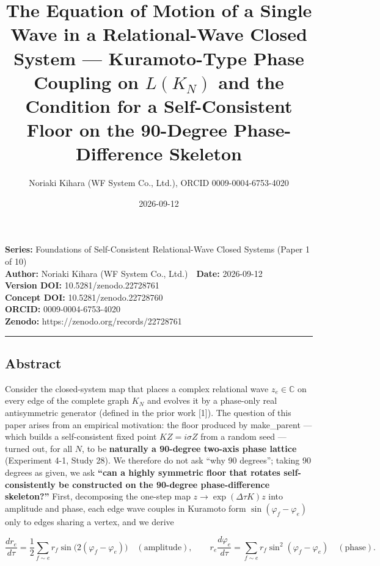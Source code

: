 \documentclass[
  a4paper,
]{ltjsarticle}
\title{The Equation of Motion of a Single Wave in a Relational-Wave
Closed System --- Kuramoto-Type Phase Coupling on \(L(K_N)\) and the
Condition for a Self-Consistent Floor on the 90-Degree Phase-Difference
Skeleton}
\author{Noriaki Kihara (WF System Co., Ltd.), ORCID 0009-0004-6753-4020}
\date{2026-09-12}
\begin{document}
\maketitle

\textbf{Series:} Foundations of Self-Consistent Relational-Wave Closed
Systems (Paper 1 of 10)\\
\textbf{Author:} Noriaki Kihara (WF System Co., Ltd.)　\textbf{Date:}
2026-09-12\\
\textbf{Version DOI:} 10.5281/zenodo.22728761\\
\textbf{Concept DOI:} 10.5281/zenodo.22728760\\
\textbf{ORCID:} 0009-0004-6753-4020\\
\textbf{Zenodo:} https://zenodo.org/records/22728761\\

\begin{center}\rule{0.5\linewidth}{0.5pt}\end{center}

\subsection{Abstract}\label{abstract}

Consider the closed-system map that places a complex relational wave
\(z_e\in\mathbb C\) on every edge of the complete graph \(K_N\) and
evolves it by a phase-only real antisymmetric generator (defined in the
prior work {[}1{]}). The question of this paper arises from an empirical
motivation: the floor produced by make\_parent --- which builds a
self-consistent fixed point \(KZ=i\sigma Z\) from a random seed ---
turned out, for all \(N\), to be \textbf{naturally a 90-degree two-axis
phase lattice} (Experiment 4-1, Study 28). We therefore do not ask ``why
90 degrees''; taking 90 degrees as given, we ask \textbf{``can a highly
symmetric floor that rotates self-consistently be constructed on the
90-degree phase-difference skeleton?''} First, decomposing the one-step
map \(z\to\exp(\Delta\tau K)z\) into amplitude and phase, each edge wave
couples in Kuramoto form \(\sin(\varphi_f-\varphi_e)\) only to edges
sharing a vertex, and we derive

\[\frac{dr_e}{d\tau}=\frac12\sum_{f\sim e}r_f\sin\!\big(2(\varphi_f-\varphi_e)\big)\quad(\text{amplitude}),\qquad r_e\frac{d\varphi_e}{d\tau}=\sum_{f\sim e}r_f\sin^2(\varphi_f-\varphi_e)\quad(\text{phase}).\]
\end{document}
